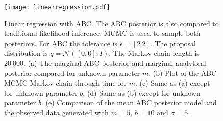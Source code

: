 \begin{figure}[H]	
	\centering
	\texttt{[image: linearregression.pdf]}
	\caption{Linear regression with ABC. The ABC posterior is also compared to traditional likelihood inference. MCMC is used to sample both posteriors. For ABC the tolerance is $\epsilon = [2\ 2]$. The proposal distribution is $q = \mathcal{N}([0,0],I)$. The Markov chain length is $20\ 000$. (a) The marginal ABC posterior and marginal analytical posterior compared for unknown parameter $m$. (b) Plot of the ABC-MCMC Markov chain through time for $m$. (c) Same as (a) except for unknown parameter $b$. (d) Same as (b) except for unknown parameter $b$. (e) Comparison of the mean ABC posterior model and the observed data generated with $m = 5$, $b = 10$ and $\sigma = 5$.}
	\label{linear-regression}
\end{figure}

